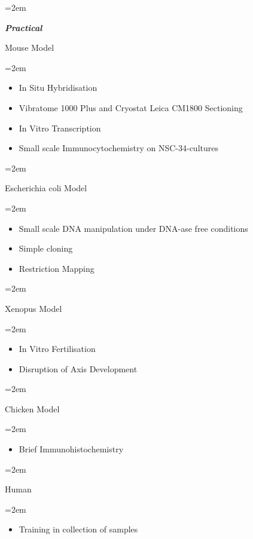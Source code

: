 \documentclass[paper=a4,fontsize=11pt]{scrartcl} %
\newlength{\spacebox}
\newcommand{\sepspace}{\vspace*{1em}}		%
\newcommand{\PersonalEntry}[2]{
		\noindent\hangindent=2em\hangafter=0 %
		\parbox{\spacebox}{        %
		\textit{#1}}		       %
		\hspace{1.5em} #2 \par}    %
\newcommand{\SkillsEntry}[2]{      %
		\noindent\hangindent=2em\hangafter=0 %
		\parbox{\spacebox}{        %
		\textit{#1}}			   %
		\hspace{1.5em} \parbox{6\spacebox}{#2} \par}    %
\begin{document}
  \SkillsEntry{\textbf{Practical}}{Mouse Model}
  \SkillsEntry{}{\begin{itemize}[noitemsep,topsep=0pt]
      \item In Situ Hybridisation
      \item Vibratome 1000 Plus and Cryostat Leica CM1800 Sectioning
      \item In Vitro Transcription
      \item Small scale Immunocytochemistry on NSC-34-cultures
    \end{itemize}}
    \vspace{3pt}
  \SkillsEntry{}{Escherichia coli Model}
  \SkillsEntry{}{\begin{itemize}[noitemsep,topsep=0pt]
      \item Small scale DNA manipulation under DNA-ase free conditions
      \item Simple cloning %
      \item Restriction Mapping
    \end{itemize}}
    \vspace{3pt}
  \SkillsEntry{}{Xenopus Model}
  \SkillsEntry{}{\begin{itemize}[noitemsep,topsep=0pt]
      \item In Vitro Fertilisation
      \item Disruption of Axis Development
    \end{itemize}}
    \vspace{3pt}
  \SkillsEntry{}{Chicken Model}
  \SkillsEntry{}{\begin{itemize}[noitemsep,topsep=0pt]
        \item Brief Immunohistochemistry
    \end{itemize}}
    \vspace{3pt}
  \SkillsEntry{}{Human}
  \SkillsEntry{}{\begin{itemize}[noitemsep,topsep=0pt]
      \item Training in collection of samples
    \end{itemize}}
  \sepspace
\end{document}

